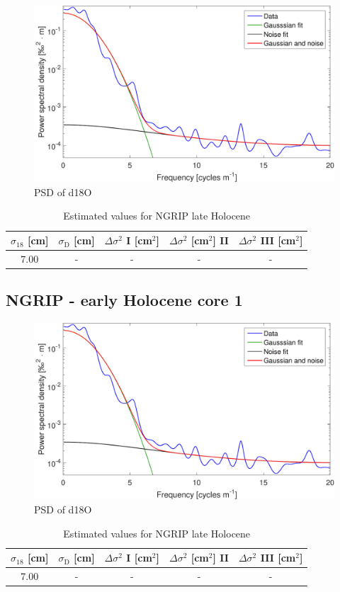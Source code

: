 \documentclass[11pt, draftcls, onecolumn]{IEEEtran} %
\numberwithin{equation}{section}
\numberwithin{table}{section}
\numberwithin{figure}{section}
\begin{document}
\begin{appendices}
\begin{figure}[H]
	\vspace*{2mm}
	\begin{center}
		\includegraphics[width=.5\textwidth]{Figure_18}
		\caption{PSD of d18O}  \label{fig:NGRIP_late}
	\end{center}
\end{figure}

\begin{table}[H]
	\center
	\caption{Estimated values for NGRIP late Holocene}
	\label{NGRIP_late_holo}
	\begin{tabular}{c c c c c} 
		\toprule
		$\sigma_{18}$ [cm] & $\sigma_\mathrm{D}$ [cm] & $\Delta\sigma^2$ I [cm$^2$] & $\Delta\sigma^2$ [cm$^2$] II & $\Delta\sigma^2$ III [cm$^2$] \\
		\midrule
		7.00 &   - &    - &     - &     - \\
		\bottomrule		
	\end{tabular}
\end{table}

\clearpage
\subsection{NGRIP - early Holocene core 1}

\begin{figure}[H]
	\vspace*{2mm}
	\begin{center}
		\includegraphics[width=.5\textwidth]{Figure_18}
		\caption{PSD of d18O}  \label{fig:NGRIP_late}
	\end{center}
\end{figure}

\begin{table}[H]
	\center
	\caption{Estimated values for NGRIP late Holocene}
	\label{NGRIP_late_holo}
	\begin{tabular}{c c c c c} 
		\toprule
		$\sigma_{18}$ [cm] & $\sigma_\mathrm{D}$ [cm] & $\Delta\sigma^2$ I [cm$^2$] & $\Delta\sigma^2$ [cm$^2$] II & $\Delta\sigma^2$ III [cm$^2$] \\
		\midrule
		7.00 &   - &    - &     - &     - \\
		\bottomrule		
	\end{tabular}
\end{table}


\end{appendices}
\end{document}

